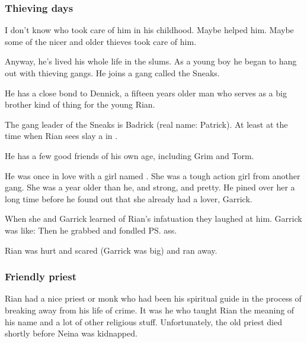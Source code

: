 




\subsubsection{Thieving days}
I don't know who took care of him in his childhood. 
Maybe  helped him. 
Maybe some of the nicer and older thieves took care of him. 

Anyway, he's lived his whole life in the slums. 
As a young boy he began to hang out with thieving gangs. 
He joins a gang called the Sneaks. 

He has a close bond to Dennick, a fifteen years older man who serves as a big brother kind of thing for the young Rian. 

The gang leader of the Sneaks is Badrick (real name: Patrick). 
At least at the time when Rian sees {\Ishnaruchaefir} slay a \ghobal{} in \Malcur. 

He has a few good friends of his own age, including Grim and Torm. 

He was once in love with a girl named \Mya. 
She was a tough action girl from another gang. 
She was a year older than he, and strong, and pretty. 
He pined over her a long time before he found out that she already had a lover, Garrick. 

When she and Garrick learned of Rian's infatuation they laughed at him. 
Garrick was like: 
Then he grabbed and fondled \ps{\Mya} ass. 

Rian was hurt and scared (Garrick was big) and ran away. 





\subsubsection{Friendly priest}
Rian had a nice priest or monk who had been his spiritual guide in the process of breaking away from his life of crime. 
It was he who taught Rian the meaning of his name and a lot of other religious stuff. 
Unfortunately, the old priest died shortly before Neina was kidnapped. 





